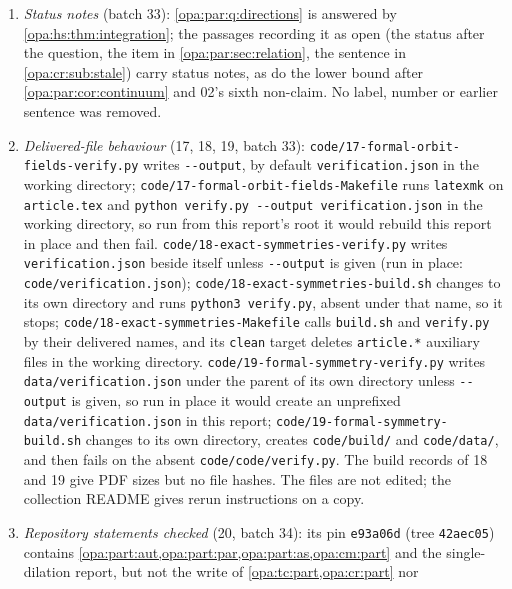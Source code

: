 \documentclass[11pt,oneside]{article}
\numberwithin{equation}{section}
\theoremstyle{definition}
\theoremstyle{remark}
\newcommand{\fn}[1]{\nolinkurl{#1}}
\begin{document}
\begin{enumerate}[itemsep=2pt]
both pins; ``left-orderable'' occurs in no other report of the collection. 19's formula $\mathsf Q$ was new at its pin and is 16's at the merge,
so it is printed once (\cref{opa:hs:cor:intermediate}). The SHA-256 hashes in 17's build record match its delivered files. No mathematical
error was found in 17, 18 or 19 (\cref{opa:of:sub:status,opa:es:sub:status,opa:hs:sub:status}).
\item \emph{Status notes} (batch 33): \cref{opa:par:q:directions} is answered by \cref{opa:hs:thm:integration}; the passages recording it as
open (the status after the question, the item in \cref{opa:par:sec:relation}, the sentence in \cref{opa:cr:sub:stale}) carry status
notes, as do the lower bound after \cref{opa:par:cor:continuum} and 02's sixth non-claim. No label, number or earlier sentence was
removed.
\item \emph{Delivered-file behaviour} (17, 18, 19, batch 33): \fn{code/17-formal-orbit-fields-verify.py} writes \fn{--output}, by
default \fn{verification.json} in the working directory; \fn{code/17-formal-orbit-fields-Makefile} runs \fn{latexmk} on
\fn{article.tex} and \fn{python verify.py --output verification.json} in the working directory, so run from this report's root it would
rebuild this report in place and then fail. \fn{code/18-exact-symmetries-verify.py} writes \fn{verification.json} beside itself unless
\fn{--output} is given (run in place: \fn{code/verification.json}); \fn{code/18-exact-symmetries-build.sh} changes to its own directory
and runs \fn{python3 verify.py}, absent under that name, so it stops; \fn{code/18-exact-symmetries-Makefile} calls \fn{build.sh} and
\fn{verify.py} by their delivered names, and its \fn{clean} target deletes \fn{article.*} auxiliary files in the working directory.
\fn{code/19-formal-symmetry-verify.py} writes \fn{data/verification.json} under the parent of its own directory unless \fn{--output} is
given, so run in place it would create an unprefixed \fn{data/verification.json} in this report;
\fn{code/19-formal-symmetry-build.sh} changes to its own directory, creates \fn{code/build/} and \fn{code/data/}, and then fails on the
absent \fn{code/code/verify.py}. The build records of 18 and 19 give PDF sizes but no file hashes. The files are not edited; the collection
README gives rerun instructions on a copy.
\item \emph{Repository statements checked} (20, batch 34): its pin \texttt{e93a06d} (tree \texttt{42aec05}) contains
\cref{opa:part:aut,opa:part:par,opa:part:as,opa:cm:part} and the single-dilation report, but not the write of \cref{opa:tc:part,opa:cr:part} nor

\end{enumerate}
\end{document}
